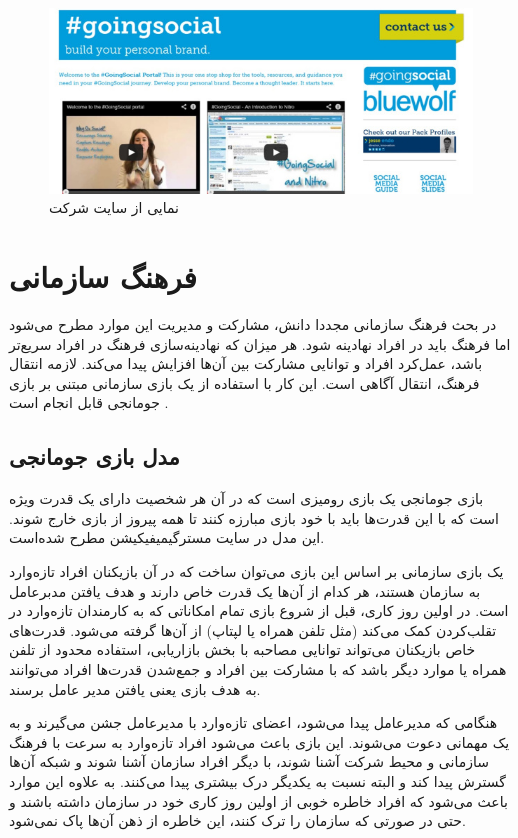 \begin{figure}[!htb]
	\centering
	\includegraphics[width=\textwidth]{Figures/goingsocial.jpg}
	\caption{نمایی از سایت شرکت  \cite{goingsocial}}
\end{figure}

\section{فرهنگ سازمانی}
در بحث فرهنگ سازمانی مجددا دانش، مشارکت و مدیریت این موارد مطرح می‌شود اما فرهنگ باید در افراد نهادینه شود. هر میزان که نهادینه‌سازی فرهنگ در افراد سریع‌تر باشد، عمل‌کرد افراد و توانایی مشارکت بین آن‌ها افزایش پیدا می‌کند. لازمه انتقال فرهنگ، انتقال آگاهی است. این کار با استفاده از یک بازی سازمانی مبتنی بر بازی جومانجی قابل انجام است \cite{amiriamin}.
\subsection{مدل بازی جومانجی}
بازی جومانجی یک بازی رومیزی است که در آن هر شخصیت دارای یک قدرت ویژه است  که با این قدرت‌ها باید با خود بازی مبارزه کنند تا همه پیروز از بازی خارج شوند. این مدل در سایت مسترگیمیفیکیشن \cite{jumanji} مطرح شده‌است.

یک بازی سازمانی بر اساس این بازی می‌توان ساخت که در آن بازیکنان افراد تازه‌وارد به سازمان هستند، هر کدام از آن‌ها یک قدرت خاص دارند و هدف یافتن مدبرعامل است. در اولین روز کاری، قبل از شروع بازی تمام امکاناتی که به کارمندان تازه‌وارد در تقلب‌کردن کمک می‌کند (مثل تلفن همراه یا لپتاپ) از آن‌ها گرفته می‌شود. قدرت‌های خاص بازیکنان می‌تواند توانایی مصاحبه با بخش بازاریابی، استفاده محدود از تلفن همراه یا موارد دیگر باشد که با مشارکت بین افراد و جمع‌شدن قدرت‌ها افراد می‌توانند به هدف بازی یعنی یافتن مدیر عامل برسند.

هنگامی که مدیرعامل پیدا می‌شود، اعضای تازه‌وارد با مدیرعامل جشن می‌گیرند و به یک مهمانی دعوت می‌شوند. 
این بازی باعث می‌شود افراد تازه‌وارد به سرعت با فرهنگ سازمانی و محیط شرکت آشنا شوند، با دیگر افراد سازمان آشنا شوند و شبکه آن‌ها گسترش پیدا کند و البته نسبت به یکدیگر درک بیشتری پیدا می‌کنند. به علاوه این موارد باعث می‌شود که افراد خاطره خوبی از اولین روز کاری خود در سازمان داشته باشند و حتی در صورتی که سازمان را ترک کنند، این خاطره از ذهن آن‌ها پاک نمی‌شود.
